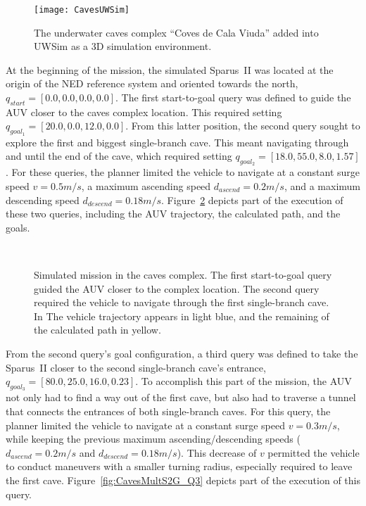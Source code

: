 \begin{figure}[htbp] %
\centering
	\texttt{[image: CavesUWSim]}
\caption[The underwater caves complex ``Coves de Cala Viuda'' added into UWSim
as a 3D simulation environment.]
{The underwater caves complex ``Coves de Cala Viuda'' added into \ac{UWSim} as a
\ac{3D} simulation environment.}
\label{fig:CavesUWSim}
\end{figure}

At the beginning of the mission, the simulated Sparus~II was located at the
origin of the \ac{NED} reference system and oriented towards the north, \ie
$q_{start} = [0.0, 0.0, 0.0, 0.0]$. The first start-to-goal query was defined to
guide the \ac{AUV} closer to the caves complex location. This required setting
$q_{goal_1} = [20.0, 0.0, 12.0, 0.0]$. From this latter position, the second
query sought to explore the first and biggest single-branch cave. This meant
navigating through and until the end of the cave, which required setting
$q_{goal_2} = [18.0, 55.0, 8.0, 1.57]$. For these queries, the planner limited
the vehicle to navigate at a constant surge speed $v=0.5m/s$, a maximum
ascending speed $d_{ascend}=0.2m/s$, and a maximum descending speed
$d_{descend}=0.18m/s$. Figure~\ref{fig:CavesMultS2G_Q2} depicts part of the
execution of these two queries, including the \ac{AUV} trajectory, the
calculated path, and the goals.

\begin{figure}[htbp]
\myfloatalign
	\\
\caption[Simulated mission in the caves complex. First and second start-to-goal
queries.] 
{Simulated mission in the caves complex. The first start-to-goal query guided
the \ac{AUV} closer to the complex location. The second query required the
vehicle to navigate through the first single-branch cave. In \protect
{} The vehicle trajectory appears in light blue,
and the remaining of the calculated path in yellow.}
\label{fig:CavesMultS2G_Q2}
\end{figure}

From the second query's goal configuration, a third query was defined to take
the Sparus~II closer to the second single-branch cave's entrance, \ie
$q_{goal_3} = [80.0, 25.0, 16.0, 0.23]$. To accomplish this part of the mission,
the \ac{AUV} not only had to find a way out of the first cave, but also had to
traverse a tunnel that connects the entrances of both single-branch caves.
For this query, the planner limited the vehicle to navigate at a constant surge
speed $v=0.3m/s$, while keeping the previous maximum ascending/descending speeds
($d_{ascend}=0.2m/s$ and $d_{descend}=0.18m/s$). This decrease of $v$ permitted
the vehicle to conduct maneuvers with a smaller turning radius, especially
required to leave the first cave. Figure~\ref{fig:CavesMultS2G_Q3} depicts part
of the execution of this query.

